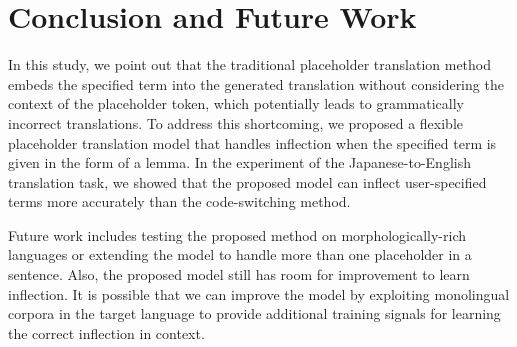 \section{Conclusion and Future Work}
In this study, we point out that the traditional placeholder translation method embeds the specified term into the generated translation without considering the context of the placeholder token, which potentially leads to grammatically incorrect translations.
To address this shortcoming, we proposed a flexible placeholder translation model that handles inflection when the specified term is given in the form of a lemma.
In the experiment of the Japanese-to-English translation task, we showed that the proposed model can inflect user-specified terms more accurately than the code-switching method.

Future work includes testing the proposed method on morphologically-rich languages or extending the model to handle more than one placeholder in a sentence.
Also, the proposed model still has room for improvement to learn inflection.
It is possible that we can improve the model by exploiting monolingual corpora in the target language to provide additional training signals for learning the correct inflection in context.
